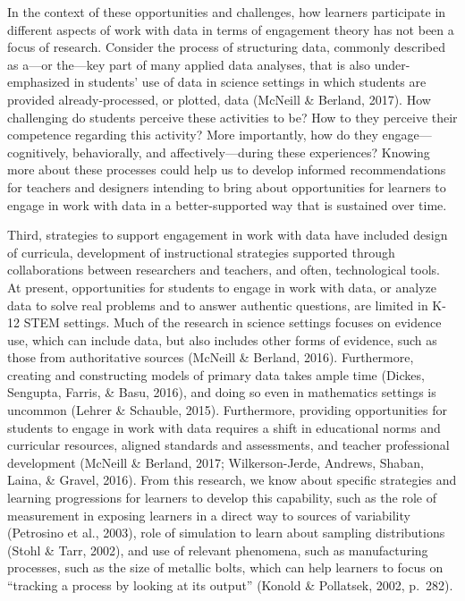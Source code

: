 \documentclass[]{msu-thesis}
\theoremstyle{definition}
\theoremstyle{definition}
\theoremstyle{definition}
\theoremstyle{remark}
\begin{document}
In the context of these opportunities and challenges, how learners
participate in different aspects of work with data in terms of
engagement theory has not been a focus of research. Consider the process
of structuring data, commonly described as a---or the---key part of many
applied data analyses, that is also under-emphasized in students' use of
data in science settings in which students are provided
already-processed, or plotted, data (McNeill \& Berland, 2017). How
challenging do students perceive these activities to be? How to they
perceive their competence regarding this activity? More importantly, how
do they engage---cognitively, behaviorally, and affectively---during
these experiences? Knowing more about these processes could help us to
develop informed recommendations for teachers and designers intending to
bring about opportunities for learners to engage in work with data in a
better-supported way that is sustained over time.

Third, strategies to support engagement in work with data have included
design of curricula, development of instructional strategies supported
through collaborations between researchers and teachers, and often,
technological tools. At present, opportunities for students to engage in
work with data, or analyze data to solve real problems and to answer
authentic questions, are limited in K-12 STEM settings. Much of the
research in science settings focuses on evidence use, which can include
data, but also includes other forms of evidence, such as those from
authoritative sources (McNeill \& Berland, 2016). Furthermore, creating
and constructing models of primary data takes ample time (Dickes,
Sengupta, Farris, \& Basu, 2016), and doing so even in mathematics
settings is uncommon (Lehrer \& Schauble, 2015). Furthermore, providing
opportunities for students to engage in work with data requires a shift
in educational norms and curricular resources, aligned standards and
assessments, and teacher professional development (McNeill \& Berland,
2017; Wilkerson-Jerde, Andrews, Shaban, Laina, \& Gravel, 2016). From
this research, we know about specific strategies and learning
progressions for learners to develop this capability, such as the role
of measurement in exposing learners in a direct way to sources of
variability (Petrosino et al., 2003), role of simulation to learn about
sampling distributions (Stohl \& Tarr, 2002), and use of relevant
phenomena, such as manufacturing processes, such as the size of metallic
bolts, which can help learners to focus on ``tracking a process by
looking at its output'' (Konold \& Pollatsek, 2002, p.~282).
\end{document}
